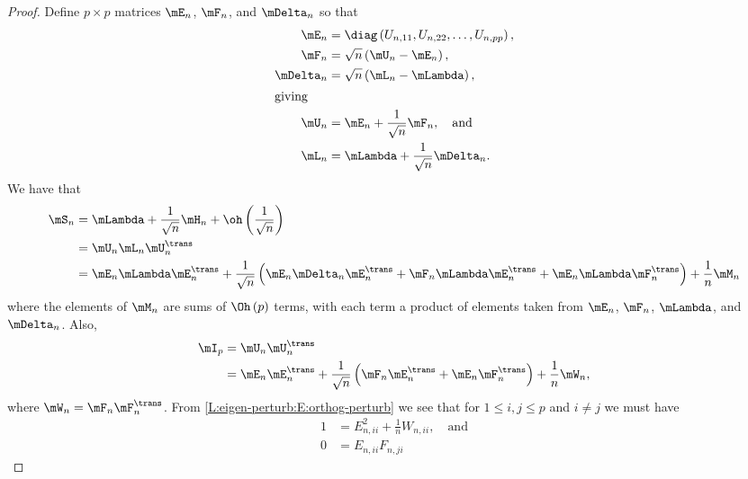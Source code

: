\begin{proof}
Define $p\times p$ matrices $\mE_n$, $\mF_n$, and $\mDelta_n$ so that
\begin{align}
    \mE_n
        &=
        \diag \left(
            U_{n,11},
            U_{n,22},
            \ldots,
            U_{n,pp}
        \right), \\
    \mF_n 
        &= 
        \sqrt{n} \left( \mU_n - \mE_n \right), \\
    \mDelta_{n}
        &=
        \sqrt{n} \left( \mL_n - \mLambda \right), \\
\intertext{giving}
    \mU_n
        &= \mE_n + \frac{1}{\sqrt{n}} \mF_n, \quad \text{and} \notag \\
    \mL_n
        &= \mLambda + \frac{1}{\sqrt{n}} \mDelta_{n}. \notag
\end{align}
We have that 
\begin{align}
    \mS_n 
    &= \mLambda 
       + \frac{1}{\sqrt{n}} \mH_n 
       + \oh \left( \frac{1}{\sqrt{n}}\right) \notag \\
    &= \mU_n \mL_n \mU_n^\trans \notag \\
    &= \mE_n \mLambda \mE_n^\trans
       + 
       \frac{1}{\sqrt{n}} \left(
           \mE_n \mDelta_n \mE_n^\trans
           +
           \mF_n \mLambda \mE_n^\trans
           +
           \mE_n \mLambda \mF_n^\trans
       \right)
       +
       \frac{1}{n}
       \mM_n \label{L:eigen-perturb:E:eigen-perturb}
\end{align}
where the elements of $\mM_n$ are sums of $\Oh\left( p \right)$ terms, with each term a product of elements taken from $\mE_n$, $\mF_n$, $\mLambda$, and $\mDelta_n$.  Also,
\begin{align}
    \mI_p
    &= \mU_n \mU_n^\trans \notag \\
    &= \mE_n \mE_n^\trans
       + 
       \frac{1}{\sqrt{n}} \left(
           \mF_n \mE_n^\trans
           +
           \mE_n \mF_n^\trans
       \right)
       + 
       \frac{1}{n}
       \mW_n, \label{L:eigen-perturb:E:orthog-perturb}
\end{align}
where $\mW_n = \mF_n \mF_n^\trans$.
From \eqref{L:eigen-perturb:E:orthog-perturb} we see that for $1 \leq i,j \leq p$ and $i \neq j$ we must have
\begin{subequations}
\begin{align}
    1 &= E_{n,ii}^2 
         + 
         \frac{1}{n} W_{n,ii}, 
         \quad \text{and}
         \label{L:eigen-perturb:E:orthog-perturb-1} \\
    0 &= E_{n,ii} F_{n,ji} 

\end{align}
\end{subequations}
\end{proof}

